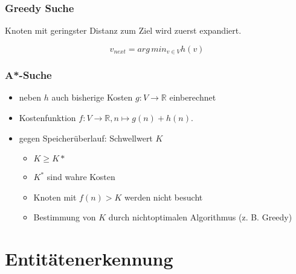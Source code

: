 \documentclass[nonacm=true, language=german]{acmart}
\begin{document}
\subsubsection{Greedy Suche}

Knoten mit geringster Distanz zum Ziel wird zuerst expandiert.

$$ v_{next} = arg\,min_{v \in V}h(v) $$

\subsubsection{A*-Suche}

\begin{itemize}
    \item neben $h$ auch bisherige Kosten $ g: V \to \mathbb{R} $ einberechnet
    \item Kostenfunktion $ f: V \to \mathbb{R}, n \mapsto g(n) + h(n) $.
    \item gegen Speicherüberlauf: Schwellwert $K$
    \begin{itemize}
        \item $K \geq K* $
        \item $K^*$ sind wahre Kosten
        \item Knoten mit $ f(n) > K $ werden nicht besucht
        \item Bestimmung von $K$ durch nichtoptimalen Algorithmus (z. B. Greedy)
    \end{itemize}
\end{itemize}

\newpage
\section{Entitätenerkennung}
\end{document}

